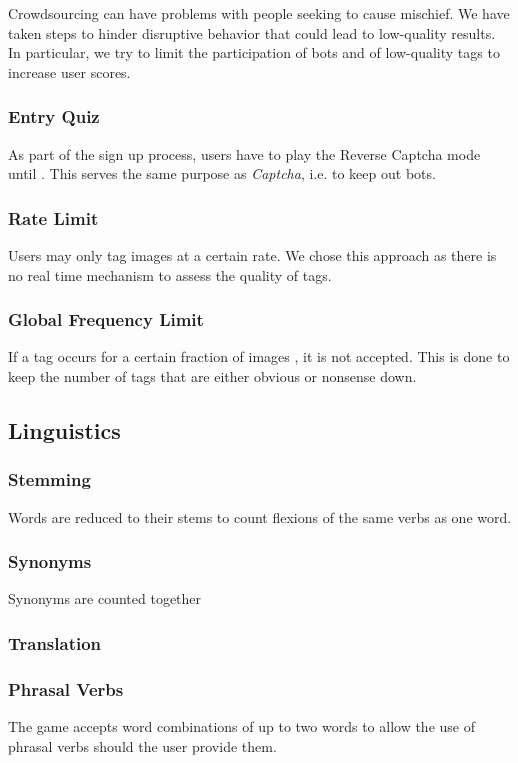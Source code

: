 Crowdsourcing can have problems with people seeking to cause mischief. We have taken steps to hinder disruptive behavior that could lead to low-quality results. In particular, we try to limit the participation of bots and  of low-quality tags to increase user scores.


\subsubsection{Entry Quiz}

As part of the sign up process, users have to play the Reverse Captcha mode until . This serves the same purpose as \textit{Captcha}, i.e. to keep out bots.


\subsubsection{Rate Limit}
Users may only tag images at a certain rate. We chose this approach as there is no real time mechanism to assess the quality of tags.

\subsubsection{Global Frequency Limit}
If a tag occurs for a certain fraction of images , it is not accepted. This is done to keep the number of tags that are either obvious or nonsense down.




\subsection{Linguistics}




\subsubsection{Stemming}
Words are reduced to their stems to count flexions of the same verbs as one word.


\subsubsection{Synonyms}
Synonyms are counted together


\subsubsection{Translation}



\subsubsection{Phrasal Verbs}
The game accepts word combinations of up to two words to allow the use of phrasal verbs should the user provide them.


